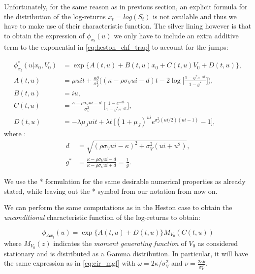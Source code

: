 Unfortunately, for the same reason as in previous section, an explicit formula for the distribution of the log-returns $x_t = log(S_t)$ is not available and thus we have to make use of their characteristic function.
The silver lining however is  that to obtain the expression of   $\phi_{x_t}(u)$ we only have to include an extra additive term to the exponential in \eqref{eq:heston_chf_trap} to account for the jumps:

\begin{subequations}
\begin{align}
\label{eq:bates_chf_trap}
\phi_{x_t}^*(u| x_0, V_0) &= \exp\{A(t,u) + B(t,u) x_0 + C(t,u) V_0 + D(t,u)\},\nonumber\\
A(t,u) &= \mu u i t +  \frac{\kappa\theta}{\sigma_V^2} \bigg( (\kappa - \rho\sigma_V u i - d)t - 2 \log\Big[  \frac{1-g^*e^{-dt}}{1-g^*} \Big] \bigg),\\
B(t,u) &= i u ,\\
C(t,u)&= \frac{\kappa - \rho\sigma_V u i - d}{\sigma_V^2} \:\Big[\frac{1-e^{-dt}}{1-g^*e^{-dt}}\Big],\\
D(t,u) &= -\lambda \mu_J u i t + \lambda t  \:\Big[ (1+\mu_J)^{ui} e^{\sigma_J^2(ui/2)(ui-1)}-1 \Big],
\end{align}
\end{subequations} 
\noindent
where :
\begin{equation*}
\begin{split}
d&=\sqrt{(\rho \sigma_V u i - \kappa)^2 + \sigma_V^2(u i + u^2)},\\
g^*&= \frac{\kappa - \rho\sigma_V u i - d}{\kappa - \rho\sigma_V u i + d} = \frac{1}{g}.
\end{split}
\end{equation*} 

We use the  *  formulation for the same desirable numerical properties as already stated, while leaving out the * symbol from our notation from now on.

We can perform the same computations as in the Heston case to obtain the \textit{unconditional} characteristic function of the log-returns to obtain:

\begin{equation}
\label{eq:bates_uncond_chf}
\phi_{\Delta x_t}(u) =  \exp\{A(t,u) + D(t,u)\} M_{V_0}(C(t,u))
\end{equation}
where $M_{V_0}(z)$ indicates the \textit{moment generating function} of $V_0$ as considered stationary and is distributed as a Gamma distribution. In particular, it will have the same expression as in \eqref{eq:cir_mgf} with $\omega = {2\kappa} / {\sigma_V^2} $
and $\nu= \frac{2\kappa\theta}{\sigma_V^2}$.

